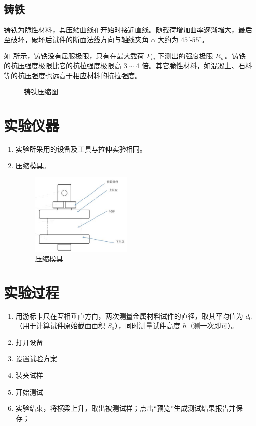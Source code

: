 \documentclass[a4paper,utf8]{article}
\begin{document}
\subsection{铸铁}
铸铁为脆性材料，其压缩曲线在开始时接近直线。随载荷增加曲率逐渐增大，最后至破坏，破坏后试件的断面法线方向与轴线夹角 $\alpha$ 大约为 $45^\circ$-$55^\circ$。\par
如 所示，铸铁没有屈服极限，只有在最大载荷 $F_m$ 下测出的强度极限 $R_m$。铸铁的抗压强度极限比它的抗拉强度极限高 $3\sim4$ 倍。其它脆性材料，如混凝土、石料等的抗压强度也远高于相应材料的抗拉强度。
\begin{figure}[!ht]
    \hspace{10mm}
    \caption{铸铁压缩图\label{fig:5}}
\end{figure}
\section{实验仪器}%
\begin{enumerate}
    \item 实验所采用的设备及工具与拉伸实验相同。
    \item 压缩模具。
    \begin{figure}[!ht]
        \caption{压缩模具}
        \includegraphics[height=40mm]{3.jpg}
    \end{figure}
\end{enumerate}
\section{实验过程}%
\begin{enumerate}
    \item 用游标卡尺在互相垂直方向，两次测量金属材料试件的直径，取其平均值为 $d_0$（用于计算试件原始截面面积 $S_0$），同时测量试件高度 $h$（测一次即可）。
    \item 打开设备
    \item 设置试验方案
    \item 装夹试样
    \item 开始测试
    \item 实验结束，将横梁上升，取出被测试样；点击“预览”生成测试结果报告并保存；
\end{enumerate}
\end{document}
